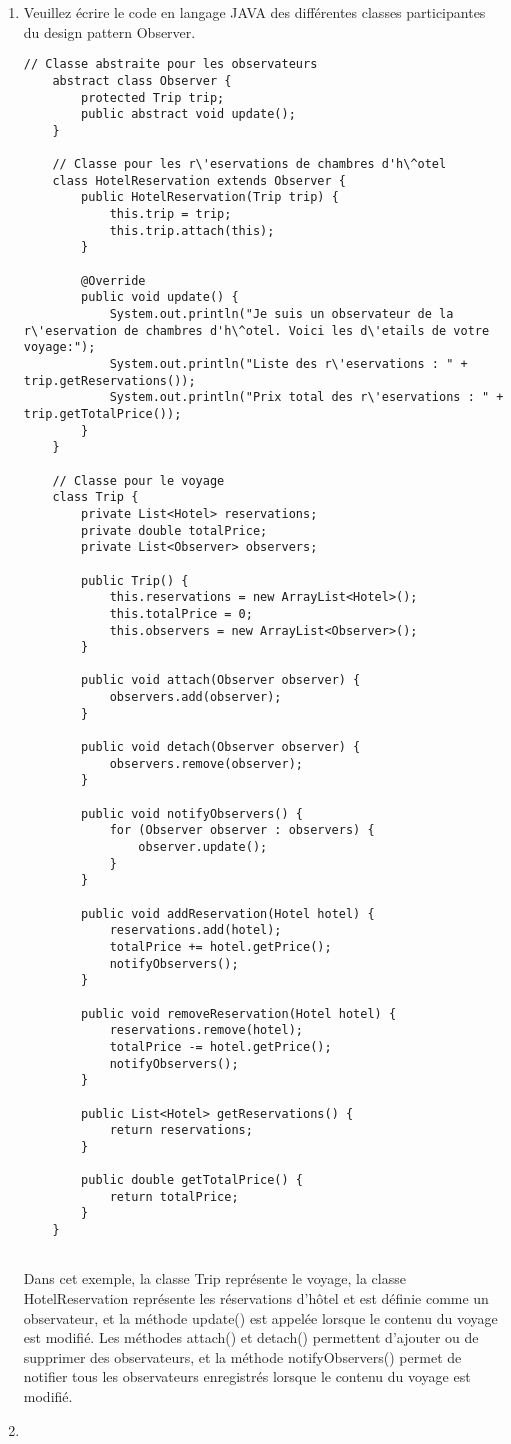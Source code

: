 \begin{enumerate}
\item Veuillez écrire le code en langage JAVA des différentes classes participantes du design pattern Observer.
\begin{lstlisting}[style=monstyle]
	// Classe abstraite pour les observateurs
	abstract class Observer {
		protected Trip trip;
		public abstract void update();
	}
	
	// Classe pour les r\'eservations de chambres d'h\^otel
	class HotelReservation extends Observer {
		public HotelReservation(Trip trip) {
			this.trip = trip;
			this.trip.attach(this);
		}
		
		@Override
		public void update() {
			System.out.println("Je suis un observateur de la r\'eservation de chambres d'h\^otel. Voici les d\'etails de votre voyage:");
			System.out.println("Liste des r\'eservations : " + trip.getReservations());
			System.out.println("Prix total des r\'eservations : " + trip.getTotalPrice());
		}
	}
	
	// Classe pour le voyage
	class Trip {
		private List<Hotel> reservations;
		private double totalPrice;
		private List<Observer> observers;
		
		public Trip() {
			this.reservations = new ArrayList<Hotel>();
			this.totalPrice = 0;
			this.observers = new ArrayList<Observer>();
		}
		
		public void attach(Observer observer) {
			observers.add(observer);
		}
		
		public void detach(Observer observer) {
			observers.remove(observer);
		}
		
		public void notifyObservers() {
			for (Observer observer : observers) {
				observer.update();
			}
		}
		
		public void addReservation(Hotel hotel) {
			reservations.add(hotel);
			totalPrice += hotel.getPrice();
			notifyObservers();
		}
		
		public void removeReservation(Hotel hotel) {
			reservations.remove(hotel);
			totalPrice -= hotel.getPrice();
			notifyObservers();
		}
		
		public List<Hotel> getReservations() {
			return reservations;
		}
		
		public double getTotalPrice() {
			return totalPrice;
		}
	}
	
\end{lstlisting}
Dans cet exemple, la classe Trip représente le voyage, la classe HotelReservation représente les réservations d'hôtel et est définie comme un observateur, et la méthode update() est appelée lorsque le contenu du voyage est modifié. Les méthodes attach() et detach() permettent d'ajouter ou de supprimer des observateurs, et la méthode notifyObservers() permet de notifier tous les observateurs enregistrés lorsque le contenu du voyage est modifié.
\item 
\end{enumerate}